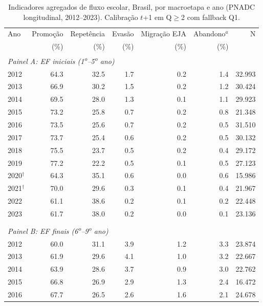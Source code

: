 \begin{table}[htbp]
\centering
\caption{Indicadores agregados de fluxo escolar, Brasil, por macroetapa e ano (PNADC longitudinal, 2012--2023). Calibra\c{c}\~ao $t$+1 em Q$\geq$2 com fallback Q1.}
\label{tab:t1_brasil}
\begin{threeparttable}
\small
\begin{tabular}{lrrrrrr}
\toprule
Ano & Promo\c{c}\~ao & Repet\^encia & Evas\~ao & Migra\c{c}\~ao EJA & Abandono$^{a}$ & N \\
    & (\%)            & (\%)        & (\%)     & (\%)               & (\%)            &   \\
\midrule
\multicolumn{7}{l}{\textit{Painel A: EF iniciais (1\textsuperscript{o}--5\textsuperscript{o} ano)}} \\
\midrule
2012 & 64.3 & 32.5 & 1.7 & 0.2 & 1.4 & 32.993 \\
2013 & 66.9 & 30.2 & 1.5 & 0.2 & 1.2 & 30.424 \\
2014 & 69.5 & 28.0 & 1.3 & 0.1 & 1.1 & 29.923 \\
2015 & 73.2 & 25.8 & 0.7 & 0.2 & 0.8 & 21.348 \\
2016 & 73.5 & 25.6 & 0.7 & 0.2 & 0.5 & 31.510 \\
2017 & 73.7 & 25.4 & 0.6 & 0.2 & 0.5 & 30.132 \\
2018 & 75.5 & 23.7 & 0.5 & 0.2 & 0.4 & 29.172 \\
2019 & 77.2 & 22.2 & 0.5 & 0.1 & 0.5 & 27.123 \\
2020$^{\dagger}$ & 64.3 & 35.1 & 0.6 & 0.0 & 0.6 & 15.986 \\
2021$^{\dagger}$ & 70.0 & 29.6 & 0.3 & 0.1 & 0.4 & 21.967 \\
2022 & 61.1 & 38.6 & 0.2 & 0.1 & 0.2 & 22.448 \\
2023 & 61.7 & 38.0 & 0.2 & 0.0 & 0.1 & 23.136 \\
\\[0.3em]
\multicolumn{7}{l}{\textit{Painel B: EF finais (6\textsuperscript{o}--9\textsuperscript{o} ano)}} \\
\midrule
2012 & 60.0 & 31.1 & 3.9 & 1.2 & 3.3 & 23.874 \\
2013 & 61.9 & 29.6 & 4.1 & 1.0 & 3.2 & 22.667 \\
2014 & 63.9 & 28.6 & 3.7 & 0.9 & 3.0 & 22.762 \\
2015 & 66.8 & 26.9 & 2.9 & 1.3 & 2.4 & 16.472 \\
2016 & 67.7 & 26.5 & 2.6 & 1.6 & 2.1 & 24.678 \\

\end{tabular}
\end{threeparttable}
\end{table}
